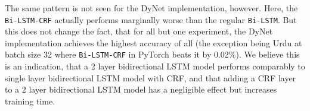 The same pattern is not seen for the DyNet implementation, however. Here, the
\texttt{Bi-LSTM-CRF} actually performs marginally worse than the regular
\texttt{Bi-LSTM}. But this does not change the fact, that for all but one
experiment, the DyNet implementation achieves the highest accuracy of all (the
exception being Urdu at batch size 32 where \texttt{Bi-LSTM-CRF} in PyTorch
beats it by 0.02\%). We believe this is an indication, that a 2 layer
bidirectional LSTM model performs comparably to single layer bidirectional LSTM
model with CRF, and that adding a CRF layer to a 2 layer bidirectional LSTM
model has a negligible effect but increases training time.

\pagebreak
